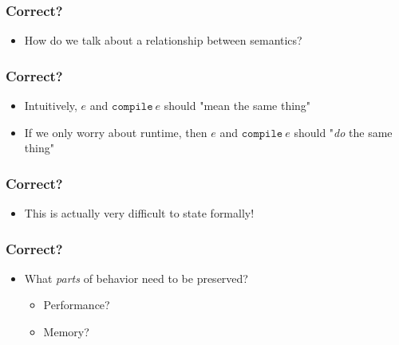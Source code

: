 \documentclass[usenames,dvipsnames]{beamer}
\newcommand{\compile}{\texttt{compile}}
\begin{document}

\begin{frame}
  \frametitle{Correct?}

  \begin{itemize}
    \item How do we talk about a relationship between semantics?
  \end{itemize}
\end{frame}


\begin{frame}
  \frametitle{Correct?}

  \begin{itemize}
    \item Intuitively, $e$ and $\compile\ e$ should "mean the same thing"
    \item If we only worry about runtime, then $e$ and $\compile\ e$ should
      "\emph{do} the same thing"
  \end{itemize}
\end{frame}


\begin{frame}
  \frametitle{Correct?}

  \begin{itemize}
    \item This is actually very difficult to state formally!
  \end{itemize}
\end{frame}


\begin{frame}
  \frametitle{Correct?}

  \begin{itemize}
    \item What \emph{parts} of behavior need to be preserved?
      \begin{itemize}
        \item Performance?
        \item Memory?
      \end{itemize}
  \end{itemize}
\end{frame}

\end{document}
